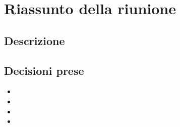 \section{Riassunto della riunione}
\subsection{Descrizione}

\subsection{Decisioni prese}
\begin{itemize}
\item 
\item 
\item 
\item 
\end{itemize}